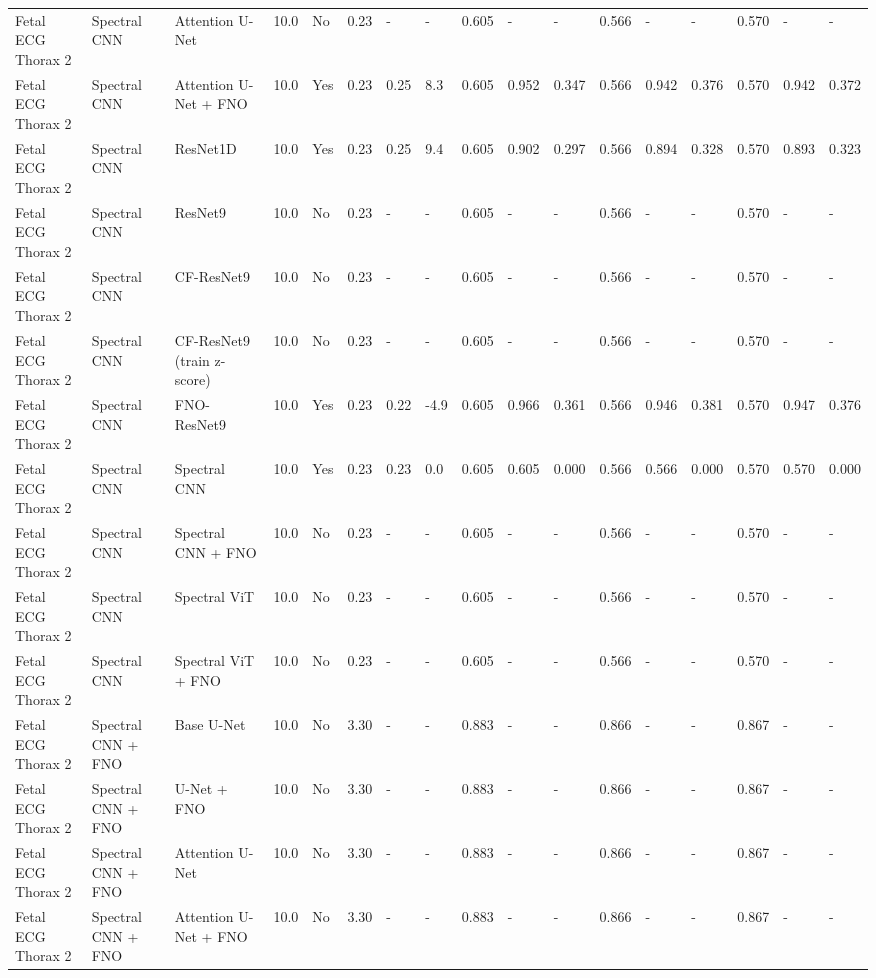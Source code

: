 \begin{longtable}{lllllllllllllllll}
Fetal ECG Thorax 2 & Spectral CNN & Attention U-Net & 10.0 & No & 0.23 & - & - & 0.605 & - & - & 0.566 & - & - & 0.570 & - & - \\
Fetal ECG Thorax 2 & Spectral CNN & Attention U-Net + FNO & 10.0 & Yes & 0.23 & 0.25 & 8.3 & 0.605 & 0.952 & 0.347 & 0.566 & 0.942 & 0.376 & 0.570 & 0.942 & 0.372 \\
Fetal ECG Thorax 2 & Spectral CNN & ResNet1D & 10.0 & Yes & 0.23 & 0.25 & 9.4 & 0.605 & 0.902 & 0.297 & 0.566 & 0.894 & 0.328 & 0.570 & 0.893 & 0.323 \\
Fetal ECG Thorax 2 & Spectral CNN & ResNet9 & 10.0 & No & 0.23 & - & - & 0.605 & - & - & 0.566 & - & - & 0.570 & - & - \\
Fetal ECG Thorax 2 & Spectral CNN & CF-ResNet9 & 10.0 & No & 0.23 & - & - & 0.605 & - & - & 0.566 & - & - & 0.570 & - & - \\
Fetal ECG Thorax 2 & Spectral CNN & CF-ResNet9 (train z-score) & 10.0 & No & 0.23 & - & - & 0.605 & - & - & 0.566 & - & - & 0.570 & - & - \\
Fetal ECG Thorax 2 & Spectral CNN & FNO-ResNet9 & 10.0 & Yes & 0.23 & 0.22 & -4.9 & 0.605 & 0.966 & 0.361 & 0.566 & 0.946 & 0.381 & 0.570 & 0.947 & 0.376 \\
Fetal ECG Thorax 2 & Spectral CNN & Spectral CNN & 10.0 & Yes & 0.23 & 0.23 & 0.0 & 0.605 & 0.605 & 0.000 & 0.566 & 0.566 & 0.000 & 0.570 & 0.570 & 0.000 \\
Fetal ECG Thorax 2 & Spectral CNN & Spectral CNN + FNO & 10.0 & No & 0.23 & - & - & 0.605 & - & - & 0.566 & - & - & 0.570 & - & - \\
Fetal ECG Thorax 2 & Spectral CNN & Spectral ViT & 10.0 & No & 0.23 & - & - & 0.605 & - & - & 0.566 & - & - & 0.570 & - & - \\
Fetal ECG Thorax 2 & Spectral CNN & Spectral ViT + FNO & 10.0 & No & 0.23 & - & - & 0.605 & - & - & 0.566 & - & - & 0.570 & - & - \\
Fetal ECG Thorax 2 & Spectral CNN + FNO & Base U-Net & 10.0 & No & 3.30 & - & - & 0.883 & - & - & 0.866 & - & - & 0.867 & - & - \\
Fetal ECG Thorax 2 & Spectral CNN + FNO & U-Net + FNO & 10.0 & No & 3.30 & - & - & 0.883 & - & - & 0.866 & - & - & 0.867 & - & - \\
Fetal ECG Thorax 2 & Spectral CNN + FNO & Attention U-Net & 10.0 & No & 3.30 & - & - & 0.883 & - & - & 0.866 & - & - & 0.867 & - & - \\
Fetal ECG Thorax 2 & Spectral CNN + FNO & Attention U-Net + FNO & 10.0 & No & 3.30 & - & - & 0.883 & - & - & 0.866 & - & - & 0.867 & - & - \\

\end{longtable}
